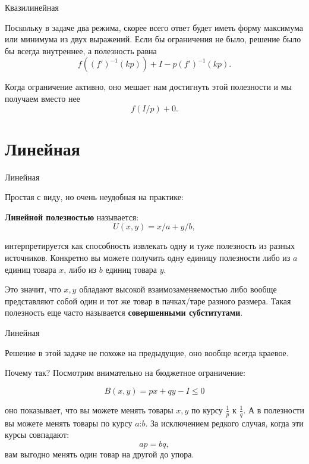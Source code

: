 \documentclass{beamer}
\begin{document}
\begin{frame}{Квазилинейная}

Поскольку в задаче два режима, скорее всего ответ будет иметь форму максимума или минимума из двух выражений. Если бы ограничения не было, решение было бы всегда внутреннее, а полезность равна 
$$f((f')^{-1}(k p)) + I - p (f')^{-1}(k p).$$

Когда ограничение активно, оно мешает нам достигнуть этой полезности и мы получаем вместо нее
$$ f(I/p) + 0.$$

\end{frame}

\section{Линейная}

\begin{frame}{Линейная}

Простая с виду, но очень неудобная на практике:

\begin{definition}
\textbf{Линейной полезностью} называется:
$$U(x, y) = x/a +y/b,$$ 
\end{definition}

интерпретируется как способность извлекать одну и туже полезность из разных источников.  Конкретно вы можете получить одну единицу полезности либо из $a$ единиц товара $x$, либо из $b$ единиц товара $y$. 

Это значит, что $x, y$ обладают высокой взаимозаменяемостью либо вообще представляют собой один и тот же товар в пачках/таре разного размера. Такая полезность еще часто называется \textbf{совершенными субститутами}.

\end{frame}

\begin{frame}{Линейная}

Решение в этой задаче не похоже на предыдущие, оно вообще всегда краевое. 

Почему так? Посмотрим внимательно на бюджетное ограничение:

$$B(x,y) = px + qy - I \leqslant 0$$ 

оно показывает, что вы можете менять товары $x, y$ по курсу $\frac{1}{p}$ к $\frac{1}{q}$. А в полезности вы можете менять товары по курсу $a$:$b$. За исключением редкого случая, когда эти курсы совпадают: 
$$ap = bq,$$ 
вам выгодно менять один товар на другой до упора.
\end{frame}
\end{document}
